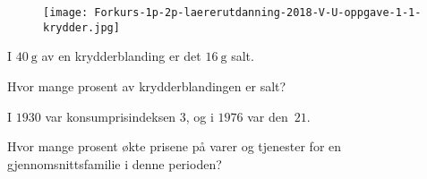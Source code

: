 %


\Oppgave[1] 

\begin{figure}[H]
  \centering
  \texttt{[image: Forkurs-1p-2p-laererutdanning-2018-V-U-oppgave-1-1-krydder.jpg]}
\end{figure}

I $\SI{40}{\g}$ av en krydderblanding er det $\SI{16}{\g}$ salt. \medskip

Hvor mange prosent av krydderblandingen er salt?


\Oppgave[1] 

I $1930$ var konsumprisindeksen 3, og i $1976$ var den $21$. \medskip

Hvor mange prosent økte prisene på varer og tjenester for en
gjennomsnittsfamilie i denne perioden?


\Oppgave[2] 


